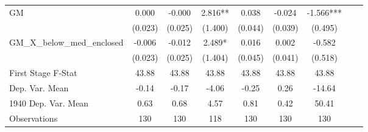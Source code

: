 \begin{tabular}{l*{8}{c}}
\cmidrule(lr){1-7}
GM              &    0.000   &   -0.000   &    2.816** &    0.038   &   -0.024   &   -1.566***\\
                &  (0.023)   &  (0.025)   &  (1.400)   &  (0.044)   &  (0.039)   &  (0.495)   \\
\addlinespace
GM\_X\_below\_med\_enclosed&   -0.006   &   -0.012   &    2.489*  &    0.016   &    0.002   &   -0.582   \\
                &  (0.023)   &  (0.025)   &  (1.404)   &  (0.045)   &  (0.041)   &  (0.518)   \\
\midrule
First Stage F-Stat&    43.88   &    43.88   &    43.88   &    43.88   &    43.88   &    43.88   \\
Dep. Var. Mean  &    -0.14   &    -0.17   &    -4.06   &    -0.25   &     0.26   &   -14.64   \\
1940 Dep. Var. Mean&     0.63   &     0.68   &     4.57   &     0.81   &     0.42   &    50.41   \\
Observations    &      130   &      130   &      118   &      130   &      130   &      130   \\
 \bottomrule \end{tabular}
